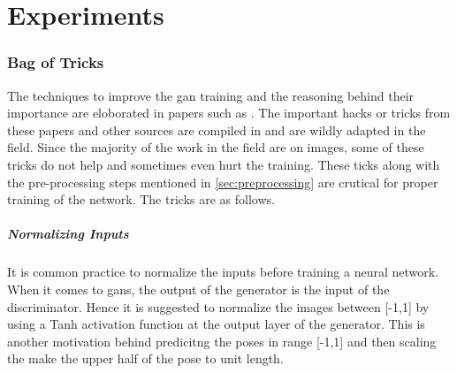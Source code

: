 \chapter{Experiments}
\label{chap:experiments}




\subsection{Bag of Tricks}
The techniques to improve the \ac{gan} training and the reasoning behind their importance are eloborated in papers such as \cite{soumith2017wasserstein,goodfellow2014generative,openaigan2wgan,improved_gan}. The important hacks or tricks from these papers and other sources are compiled in \cite{gan_hacks} and are wildly adapted in the field. Since the majority of the work in the field are on images, some of these tricks do not help and sometimes even hurt the training. These ticks along with the pre-processing steps mentioned in \ref{sec:preprocessing} are crutical for proper training of the network. The tricks are as follows. %
 
\paragraph{Normalizing Inputs} 
It is common practice to normalize the inputs before training a neural network. When it comes to \acp{gan}, the output of the generator is the input of the discriminator. Hence it is suggested to normalize the images between [-1,1] by using a Tanh activation function at the output layer of the generator. This is another motivation behind predicitng the poses in range [-1,1] and then scaling the make the upper half of the pose to unit length.

